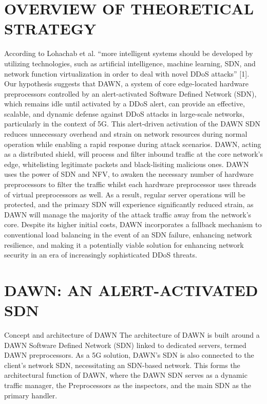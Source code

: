 \documentclass[conference]{IEEEtran}
\begin{document}
\section{OVERVIEW OF THEORETICAL STRATEGY } 

According to Lohachab et al. “more intelligent systems should be developed by utilizing technologies, such as artificial intelligence, machine learning, SDN, and network function virtualization in order to deal with novel DDoS attacks” [1]. Our hypothesis suggests that DAWN, a system of core edge-located hardware preprocessors controlled by an alert-activated Software Defined Network (SDN), which remains idle until activated by a DDoS alert, can provide an effective, scalable, and dynamic defense against DDoS attacks in large-scale networks, particularly in the context of 5G. This alert-driven activation of the DAWN SDN reduces unnecessary overhead and strain on network resources during normal operation while enabling a rapid response during attack scenarios. DAWN, acting as a distributed shield, will process and filter inbound traffic at the core network's edge, whitelisting legitimate packets and black-lisiting malicious ones. DAWN uses the power of SDN and NFV, to awaken the necessary number of hardware preprocessors to filter the traffic whilst each hardware preprocessor uses threads of virtual preprocessors as well. As a result, regular server operations will be protected, and the primary SDN will experience significantly reduced strain, as DAWN will manage the majority of the attack traffic away from the network's core. Despite its higher initial costs, DAWN incorporates a fallback mechanism to conventional load balancing in the event of an SDN failure, enhancing network resilience, and making it a potentially viable solution for enhancing network security in an era of increasingly sophisticated DDoS threats.

\section{DAWN: AN ALERT-ACTIVATED SDN} 
Concept and architecture of DAWN
The architecture of DAWN is built around a DAWN Software Defined Network (SDN) linked to dedicated servers, termed DAWN preprocessors. As a 5G solution, DAWN's SDN is also connected to the client's network SDN, necessitating an SDN-based network. This forms the architectural function of DAWN, where the DAWN SDN serves as a dynamic traffic manager, the Preprocessors as the inspectors, and the main SDN as the primary handler. 
\end{document}
